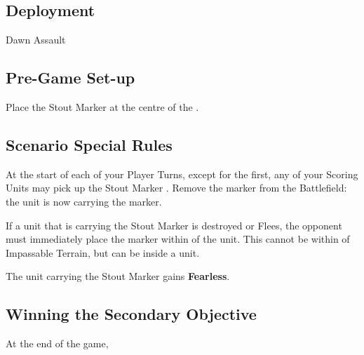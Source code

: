 
\label{BarrelOfStout}


\subsection*{Deployment}

 Dawn Assault


\subsection*{Pre-Game Set-up}

Place the Stout Marker at the centre of the .

\subsection*{Scenario Special Rules}

At the start of each of your Player Turns, except for the first, any of your Scoring Units may pick up the Stout Marker . Remove the marker from the Battlefield: the unit is now carrying the marker.


If a unit that is carrying the Stout Marker is destroyed or Flees, the opponent must immediately place the marker  within  of the unit. This  cannot be within  of Impassable Terrain, but can be inside a unit.

The unit carrying the Stout Marker gains \textbf{Fearless}.

\subsection*{Winning the Secondary Objective}

At the end of the game, 

